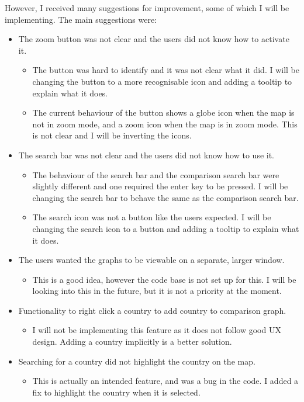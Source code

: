 \documentclass{report}
\begin{document}
However, I received many suggestions for improvement, some of which I will be implementing. The main suggestions were:
\begin{itemize}
    \item The zoom button was not clear and the users did not know how to activate it.
    \begin{itemize}
        \item The button was hard to identify and it was not clear what it did. I will be changing the button to a more recognisable icon and adding a tooltip to explain what it does.
        \item The current behaviour of the button shows a globe icon when the map is not in zoom mode, and a zoom icon when the map is in zoom mode. This is not clear and I will be inverting the icons.
    \end{itemize}
    \item The search bar was not clear and the users did not know how to use it.
    \begin{itemize}
        \item The behaviour of the search bar and the comparison search bar were slightly different and one required the enter key to be pressed. I will be changing the search bar to behave the same as the comparison search bar.
        \item The search icon was not a button like the users expected. I will be changing the search icon to a button and adding a tooltip to explain what it does.
    \end{itemize}
    \item The users wanted the graphs to be viewable on a separate, larger window.
    \begin{itemize}
        \item This is a good idea, however the code base is not set up for this. I will be looking into this in the future, but it is not a priority at the moment.
    \end{itemize}
    \item Functionality to right click a country to add country to comparison graph.
    \begin{itemize}
        \item I will not be implementing this feature as it does not follow good UX design. Adding a country implicitly is a better solution.
    \end{itemize}
    \item Searching for a country did not highlight the country on the map.
    \begin{itemize}
        \item This is actually an intended feature, and was a bug in the code. I added a fix to highlight the country when it is selected.
    \end{itemize}
\end{itemize}
\end{document}

